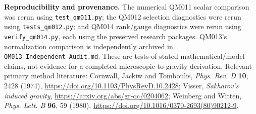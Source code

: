 \documentclass[11pt,a4paper]{article}
\begin{document}
\textbf{Reproducibility and provenance.} The numerical QM011 scalar comparison was rerun using \texttt{test\_qm011.py}; the QM012 selection diagnostics were rerun using \texttt{tests\_qm012.py}; and QM014 rank/gauge diagnostics were rerun using \texttt{verify\_qm014.py}, each using the preserved research packages. QM013's normalization comparison is independently archived in \texttt{QM013\_Independent\_Audit.md}. These are tests of stated mathematical/model claims, not evidence for a completed microscopic-to-gravity derivation. Relevant primary method literature: Cornwall, Jackiw and Tomboulis, \emph{Phys. Rev. D} \textbf{10}, 2428 (1974), \url{https://doi.org/10.1103/PhysRevD.10.2428}; Visser, \emph{Sakharov's induced gravity}, \url{https://arxiv.org/abs/gr-qc/0204062}; Weinberg and Witten, \emph{Phys. Lett. B} \textbf{96}, 59 (1980), \url{https://doi.org/10.1016/0370-2693(80)90212-9}.
\end{document}
